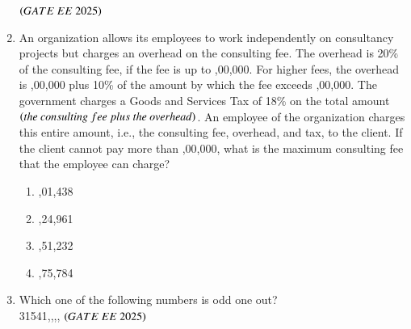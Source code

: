 \documentclass[journal,12pt,onecolumn]{IEEEtran}
\theoremstyle{remark}
\begin{document}
\begin{enumerate}
  \hfill $\brak{GATE\ EE\ 2025}$
\begin{enumerate}
\end{enumerate}
  \item An organization allows its employees to work independently on consultancy projects but charges an overhead on the consulting fee. The overhead is 20\% of the consulting fee, if the fee is up to ,00,000. For higher fees, the overhead is ,00,000 plus 10\% of the amount by which the fee exceeds ,00,000. The government charges a Goods and Services Tax of 18\% on the total amount $\brak{the\ consulting\ fee\ plus\ the\ overhead}$. An employee of the organization charges this entire amount, i.e., the consulting fee, overhead, and tax, to the client. If the client cannot pay more than ,00,000, what is the maximum consulting fee that the employee can charge?  

  \begin{multicols}{4}
  \begin{enumerate}
    \item {},01,438
    \item {},24,961
    \item {},51,232
    \item {},75,784
  \end{enumerate}
  \end{multicols}

\item Which one of the following numbers is odd one out? \\
31541,,,,
\hfill $\brak{GATE\ EE\ 2025}$
\begin{enumerate}
\end{enumerate}


\end{enumerate}
\end{document}
